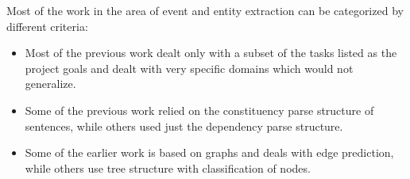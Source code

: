 Most of the work in the area of event and entity extraction can be categorized by different criteria:

\begin{itemize}

\item {} Most of the previous work dealt only with a subset of the tasks listed as the project goals and dealt with very specific domains which would not generalize.

\item {} Some of the previous work relied on the constituency parse structure of sentences, while others used just the dependency parse structure.

\item {} Some of the earlier work is based on graphs and deals with edge prediction, while others use tree structure with classification of nodes.

\end{itemize}